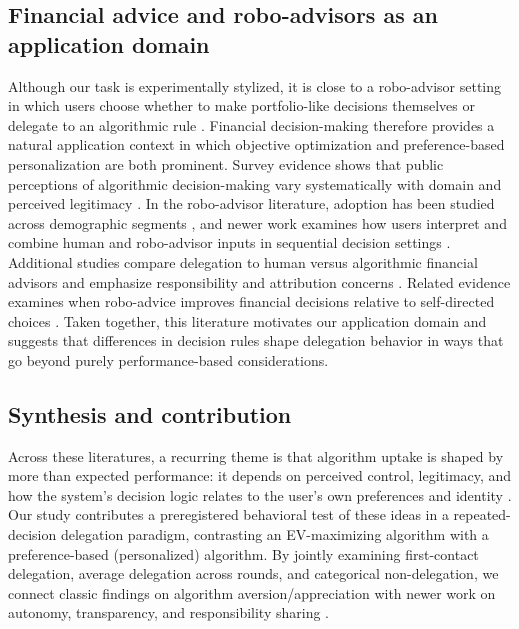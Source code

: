 \documentclass[a4paper, 12pt, fleqn]{article}
\theoremstyle{definition}
\begin{document}
\subsection{Financial advice and robo-advisors as an application domain}
Although our task is experimentally stylized, it is close to a robo-advisor setting in which users choose whether to make portfolio-like decisions themselves or delegate to an algorithmic rule \citep{Figa-Talamanca2022,Mahmud2025}. Financial decision-making therefore provides a natural application context in which objective optimization and preference-based personalization are both prominent. Survey evidence shows that public perceptions of algorithmic decision-making vary systematically with domain and perceived legitimacy \citep{Aysolmaz2023}. In the robo-advisor literature, adoption has been studied across demographic segments \citep{Figa-Talamanca2022}, and newer work examines how users interpret and combine human and robo-advisor inputs in sequential decision settings \citep{Mahmud2025}. Additional studies compare delegation to human versus algorithmic financial advisors and emphasize responsibility and attribution concerns \citep{Ismagilova2025}. Related evidence examines when robo-advice improves financial decisions relative to self-directed choices \citep{Lambrecht2023}. Taken together, this literature motivates our application domain and suggests that differences in decision rules shape delegation behavior in ways that go beyond purely performance-based considerations.

\subsection{Synthesis and contribution}
Across these literatures, a recurring theme is that algorithm uptake is shaped by more than expected performance: it depends on perceived control, legitimacy, and how the system's decision logic relates to the user's own preferences and identity \citep{Dietvorst2018,Logg2019,Chugunova2022}. Our study contributes a preregistered behavioral test of these ideas in a repeated-decision delegation paradigm, contrasting an EV-maximizing algorithm with a preference-based (personalized) algorithm. By jointly examining first-contact delegation, average delegation across rounds, and categorical non-delegation, we connect classic findings on algorithm aversion/appreciation with newer work on autonomy, transparency, and responsibility sharing \citep{Candrian2022,Gazit2023,Hu2024,Fink2024}.
\end{document}
